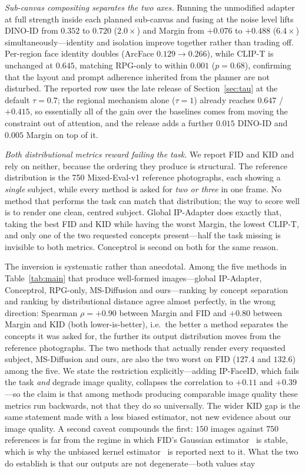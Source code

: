\documentclass[10pt,twocolumn,letterpaper]{article}
\begin{document}
\noindent\textit{Sub-canvas compositing separates the two axes.}
Running the unmodified adapter at full strength inside each planned
sub-canvas and fusing at the noise level lifts DINO-ID from $0.352$ to
$\mathbf{0.720}$ ($2.0\times$) and Margin from $+0.076$ to
$\mathbf{+0.488}$ ($6.4\times$) simultaneously---identity and isolation
improve together rather than trading off.  Per-region face identity
doubles (ArcFace $0.129\!\to\!0.266$), while CLIP-T is unchanged at
$0.645$, matching RPG-only to within $0.001$ ($p{=}0.68$), confirming that
the layout and prompt adherence inherited from the planner are not
disturbed.  The reported row uses the late release of
Section~\ref{sec:tau} at the default $\tau{=}0.7$; the regional
mechanism alone ($\tau{=}1$) already reaches $0.647$ / $+0.415$, so
essentially all of the gain over the baselines comes from moving the
constraint out of attention, and the release adds a further $0.015$
DINO-ID and $0.005$ Margin on top of it.

\noindent\textit{Both distributional metrics reward failing the task.}
We report FID and KID and rely on neither, because the ordering they produce
is structural.  The reference distribution is the 750 Mixed-Eval-v1 reference
photographs, each showing a \emph{single} subject, while every method is asked
for \emph{two or three} in one frame.  No method that performs the task can
match that distribution; the way to score well is to render one clean, centred
subject.  Global IP-Adapter does exactly that, taking the best FID and KID
while having the worst Margin, the lowest CLIP-T, and only one of the two
requested concepts present---half the task missing is invisible to both
metrics.  Conceptrol is second on both for the same reason.

The inversion is systematic rather than anecdotal.  Among the five methods in
Table~\ref{tab:main} that produce well-formed images---global IP-Adapter,
Conceptrol, RPG-only, MS-Diffusion and ours---ranking by concept separation
and ranking by distributional distance agree almost perfectly, in the wrong
direction: Spearman $\rho=+0.90$ between Margin and FID and $+0.80$ between
Margin and KID (both lower-is-better), i.e.\ the better a method separates
the concepts it was asked for, the further its output distribution moves from
the reference photographs.  The two methods that actually render every
requested subject, MS-Diffusion and ours, are also the two worst on FID
($127.4$ and $132.6$) among the five.  We state the restriction
explicitly---adding IP-FaceID, which fails the task \emph{and}
degrade image quality, collapses the correlation to $+0.11$ and
$+0.39$---so the claim is that among methods producing comparable image
quality these metrics run backwards, not that they do so universally.
The wider KID gap is the same statement made with a less biased estimator,
not new evidence about our image quality.
A second caveat compounds the first: $150$ images against $750$ references is
far from the regime in which FID's Gaussian
estimator~\cite{heusel2017gans} is stable, which is why the unbiased kernel
estimator~\cite{binkowski2018demystifying} is reported next to it.  What the
two do establish is that our outputs are not degenerate---both values stay
\end{document}
